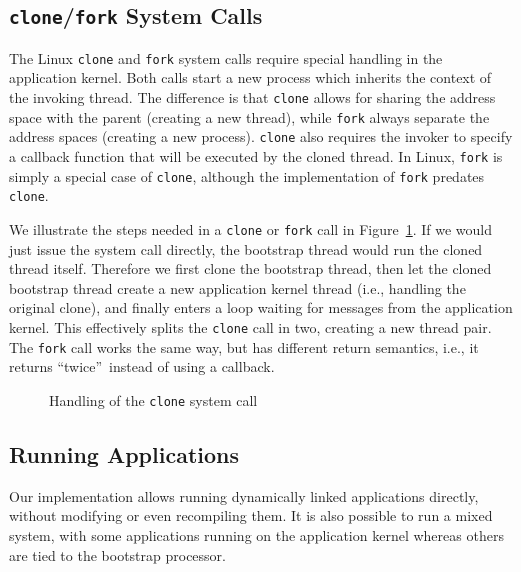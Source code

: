 \subsection{\texttt{clone}/\texttt{fork} System Calls}
\label{sec:appkern:clone}
The Linux \texttt{clone} and \texttt{fork} system calls require special
handling in the application kernel. Both calls start a new process which
inherits the context of the invoking thread. The difference is that
\texttt{clone} allows for sharing the address space with the parent (creating
a new thread), while \texttt{fork} always separate the address spaces
(creating a new process).  \texttt{clone} also requires the invoker to specify
a callback function that will be executed by the cloned thread.  In Linux,
\texttt{fork} is simply a special case of \texttt{clone},
\label{fix:clone}although the implementation of \texttt{fork} predates
\texttt{clone}.

We illustrate the steps needed in a \texttt{clone} or \texttt{fork} call in
Figure~\ref{fig:clone}. If we would just issue the system call directly, the
bootstrap thread would run the cloned thread itself. Therefore we first clone
the bootstrap thread, then let the cloned bootstrap thread create a new
application kernel thread (i.e., handling the original clone), and finally
enters a loop waiting for messages from the application kernel. This
effectively splits the \texttt{clone} call in two, creating a new thread pair.
The \texttt{fork} call works the same way, but has different return semantics,
i.e., it returns ``twice''~instead of using a callback.

\begin{figure}
  \begin{center}
  \end{center}
  \caption{Handling of the \texttt{clone} system call}
  \label{fig:clone}
\end{figure}

\subsection{Running Applications}
\label{sec:appkern:running_applications}
Our implementation allows running dynamically linked applications directly,
without modifying or even recompiling them. It is also possible to run a mixed
system, with some applications running on the application kernel whereas
others are tied to the bootstrap processor.

